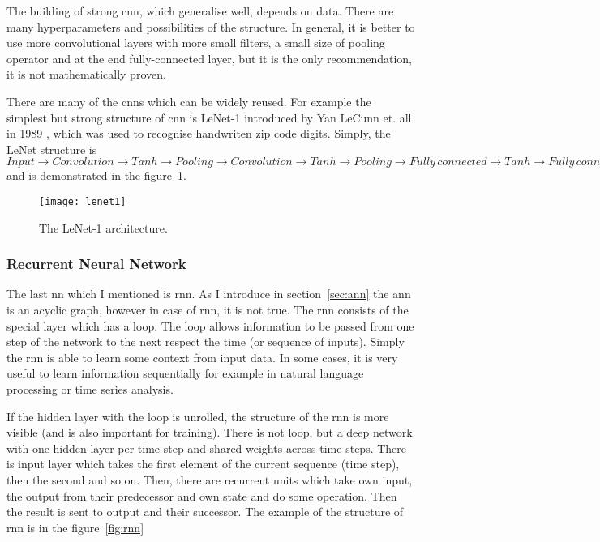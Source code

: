\documentclass[thesis=M,english]{FITthesis}[2012/10/20]
\begin{document}
The building of strong \gls{cnn}, which generalise well, depends on data. There are many hyperparameters and possibilities of the structure. In general, it is better to use more convolutional layers with more small filters, a small size of pooling operator and at the end fully-connected layer\cite{Johnson2017cnn}, but it is the only recommendation, it is not mathematically proven.

There are many of the \gls{cnn}s which can be widely reused. For example the simplest but strong structure of \gls{cnn} is LeNet-1 introduced by Yan LeCunn et. all in 1989 \cite{Lecun1989cnn}, which was used to recognise handwriten zip code digits. Simply, the LeNet structure is $Input \rightarrow Convolution \rightarrow Tanh \rightarrow Pooling \rightarrow Convolution \rightarrow Tanh \rightarrow Pooling \rightarrow Fully\,connected \rightarrow Tanh \rightarrow Fully\,connected$ and is demonstrated in the figure~\ref{fig:lenet}.

\begin{figure}[ht]\centering
    \texttt{[image: lenet1]}
    \caption{The LeNet-1 architecture. \cite[548]{Lecun1989cnn}}\label{fig:lenet}
\end{figure}

\subsubsection{Recurrent Neural Network}

The last \gls{nn} which I mentioned is \gls{rnn}. As I introduce in section~\ref{sec:ann} the \gls{ann} is an acyclic graph, however in case of \gls{rnn}, it is not true. The \gls{rnn} consists of the special layer which has a loop. The loop allows information to be passed from one step of the network to the next respect the time (or sequence of inputs). Simply the \gls{rnn} is able to learn some context from input data. In some cases, it is very useful to learn information sequentially for example in natural language processing or time series analysis.  

If the hidden layer with the loop is unrolled, the structure of the \gls{rnn} is more visible (and is also important for training). There is not loop, but a deep network with one hidden layer per time step and shared weights across time steps. There is input layer which takes the first element of the current sequence (time step), then the second and so on. Then, there are recurrent units which take own input, the output from their predecessor and own state and do some operation. Then the result is sent to output and their successor.\cite{Lipton2015rnn} The example of the structure of \gls{rnn} is in the figure~\ref{fig:rnn}
\end{document}
